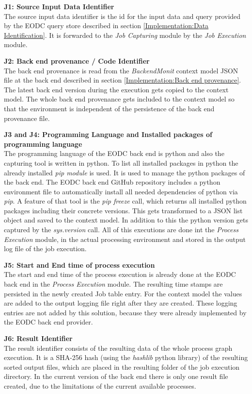 \documentclass[draft,final]{vutinfth} %
\begin{document}
\textbf{J1:  Source Input Data Identifier} \\
The source input data identifier is the id for the input data and query provided by the EODC query store described in section \ref{Implementation:Data Identification}. It is forwarded to the \textit{Job Capturing} module by the \textit{Job Execution} module. 

\textbf{J2: Back end provenance / Code Identifier} \\
The back end provenance is read from the \textit{BackendMonit} context model JSON file at the back end described in section \ref{Implementation:Back end provenance}. The latest back end version during the execution gets copied to the context model. The whole back end provenance gets included to the context model so that the environment is independent of the persistence of the back end provenance file. 

\textbf{J3 and J4: Programming Language and  Installed packages of programming language} \\
The programming language of the EODC back end is python and also the capturing tool is written in python. To list all installed packages in python the already installed \textit{pip module}  is used. It is used to manage the python packages of the back end. The EODC back end GitHub repository includes a python environment file to automatically install all needed dependencies of python via \textit{pip}. A feature of that tool is the \textit{pip freeze} call, which returns all installed python packages including their concrete versions. This gets transformed to a JSON list object and saved to the context model. In addition to this the python version gets captured by the \textit{sys.version} call. All of this executions are done int the \textit{Process Execution} module, in the actual processing environment and stored in the output log file of the job execution.    

\textbf{J5: Start and End time of process execution} \\
The start and end time of the process execution is already done at the EODC back end in the  \textit{Process Execution} module. The resulting time stamps are persisted in the newly created Job table entry. For the context model the values are added to the output logging file right after they are created. These logging entries are not added by this solution, because they were already implemented by the EODC back end provider.  

\textbf{J6: Result Identifier } \\
The result identifier consists of the resulting data of the whole process graph execution. It is a SHA-256 hash (using the \textit{hashlib} python library) of the resulting sorted output files, which are placed in the resulting folder of the job execution directory. In the current version of the back end there is only one result file created, due to the limitations of the current available processes. 
\end{document}
